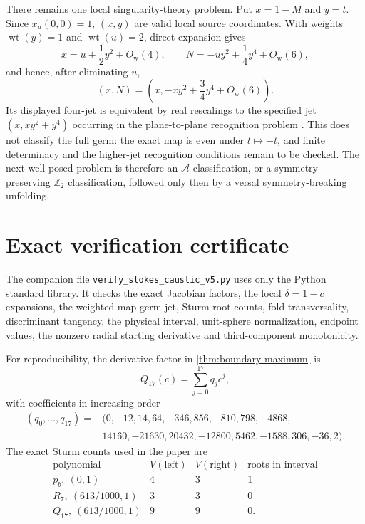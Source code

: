 \documentclass[11pt]{article}
\theoremstyle{definition}
\begin{document}
There remains one local singularity-theory problem.  Put $x=1-M$ and $y=t$.
Since $x_u(0,0)=1$, $(x,y)$ are valid local source coordinates.  With weights
$\operatorname{wt}(y)=1$ and $\operatorname{wt}(u)=2$, direct expansion gives
\[
x=u+\frac12y^2+O_{\mathrm w}(4),\qquad
N=-uy^2+\frac14y^4+O_{\mathrm w}(6),
\]
and hence, after eliminating $u$,
\[
(x,N)=\left(x,-xy^2+\frac34y^4+O_{\mathrm w}(6)\right).
\]
Its displayed four-jet is equivalent by real rescalings to the specified
jet $(x,xy^2+y^4)$ occurring in the plane-to-plane recognition problem
\cite{kabata2016}.  This does not classify the full germ: the exact map is
even under $t\mapsto-t$, and finite determinacy and the higher-jet recognition
conditions remain to be checked.  The next well-posed problem is therefore an
$\mathcal A$-classification, or a symmetry-preserving $\mathbb Z_2$
classification, followed only then by a versal symmetry-breaking unfolding.

\appendix
\section{Exact verification certificate}\label{app:certificate}

The companion file \texttt{verify\_stokes\_caustic\_v5.py} uses only the
Python standard library.  It checks the exact Jacobian factors, the local
$\delta=1-c$ expansions, the weighted map-germ jet, Sturm root counts, fold
transversality, discriminant tangency, the physical interval, unit-sphere
normalization, endpoint values, the nonzero radial starting derivative and
third-component monotonicity.

For reproducibility, the derivative factor in
\cref{thm:boundary-maximum} is
\[
Q_{17}(c)=\sum_{j=0}^{17}q_jc^j,
\]
with coefficients in increasing order
\[
\begin{split}
(q_0,\ldots,q_{17})={}&
(0,-12,14,64,-346,856,-810,798,-4868,\\
&14160,-21630,20432,-12800,5462,-1588,306,-36,2).
\end{split}
\]
The exact Sturm counts used in the paper are
\[
\begin{array}{c|cc|c}
\text{polynomial}&V(\text{left})&V(\text{right})&
\text{roots in interval}\\
\hline
p_b,\ (0,1)&4&3&1\\
R_7,\ (613/1000,1)&3&3&0\\
Q_{17},\ (613/1000,1)&9&9&0.
\end{array}
\]
\end{document}
